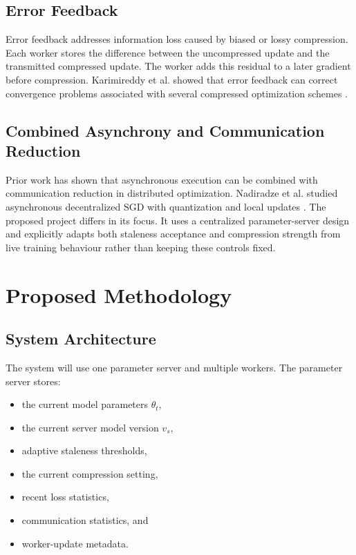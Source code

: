 \documentclass[conference]{IEEEtran}
\begin{document}
\subsection{Error Feedback}

Error feedback addresses information loss caused by biased or lossy compression. Each worker stores the difference between the uncompressed update and the transmitted compressed update. The worker adds this residual to a later gradient before compression. Karimireddy et al. showed that error feedback can correct convergence problems associated with several compressed optimization schemes \cite{karimireddy2019ef}.

\subsection{Combined Asynchrony and Communication Reduction}

Prior work has shown that asynchronous execution can be combined with communication reduction in distributed optimization. Nadiradze et al. studied asynchronous decentralized SGD with quantization and local updates \cite{nadiradze2021async}. The proposed project differs in its focus. It uses a centralized parameter-server design and explicitly adapts both staleness acceptance and compression strength from live training behaviour rather than keeping these controls fixed.

\section{Proposed Methodology}

\subsection{System Architecture}

The system will use one parameter server and multiple workers. The parameter server stores:
\begin{itemize}
    \item the current model parameters $\theta_t$,
    \item the current server model version $v_s$,
    \item adaptive staleness thresholds,
    \item the current compression setting,
    \item recent loss statistics,
    \item communication statistics, and
    \item worker-update metadata.
\end{itemize}
\end{document}
